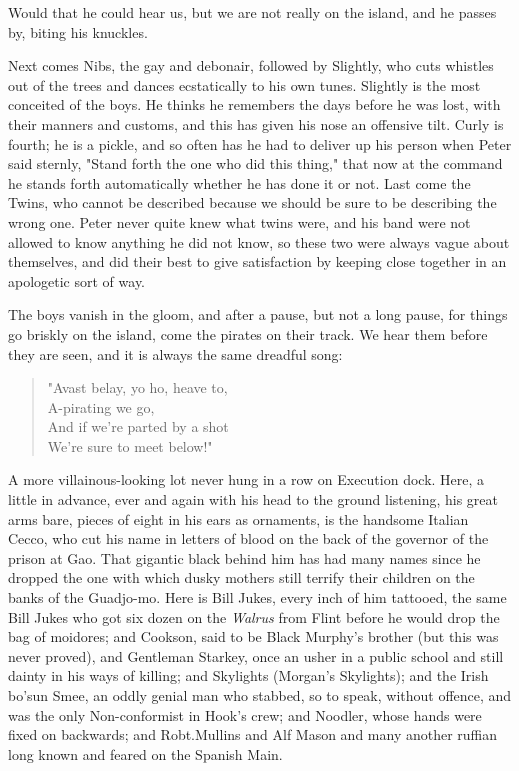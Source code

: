Would that he could hear us, but we are not really on the island, and he passes by, biting his knuckles.

Next comes Nibs, the gay and debonair, followed by Slightly, who cuts whistles out of the trees and dances ecstatically to his own tunes.
Slightly is the most conceited of the boys.
He thinks he remembers the days before he was lost, with their manners and customs, and this has given his nose an offensive tilt.
Curly is fourth;
he is a pickle, and so often has he had to deliver up his person when Peter said sternly, "Stand forth the one who did this thing," that now at the command he stands forth automatically whether he has done it or not.
Last come the Twins, who cannot be described because we should be sure to be describing the wrong one.
Peter never quite knew what twins were, and his band were not allowed to know anything he did not know, so these two were always vague about themselves, and did their best to give satisfaction by keeping close together in an apologetic sort of way.

The boys vanish in the gloom, and after a pause, but not a long pause, for things go briskly on the island, come the pirates on their track.
We hear them before they are seen, and it is always the same dreadful song:

\begin{verse}
	"Avast belay, yo ho, heave to,\\
	A-pirating we go,\\
	And if we're parted by a shot\\
	We're sure to meet below!"
\end{verse}

A more villainous-looking lot never hung in a row on Execution dock.
Here, a little in advance, ever and again with his head to the ground listening, his great arms bare, pieces of eight in his ears as ornaments, is the handsome Italian Cecco, who cut his name in letters of blood on the back of the governor of the prison at Gao.
That gigantic black behind him has had many names since he dropped the one with which dusky mothers still terrify their children on the banks of the Guadjo-mo.
Here is Bill Jukes, every inch of him tattooed, the same Bill Jukes who got six dozen on the \emph{Walrus} from Flint before he would drop the bag of moidores;
and Cookson, said to be Black Murphy's brother (but this was never proved), and Gentleman Starkey, once an usher in a public school and still dainty in his ways of killing;
and Skylights (Morgan's Skylights);
and the Irish bo'sun Smee, an oddly genial man who stabbed, so to speak, without offence, and was the only Non-conformist in Hook's crew;
and Noodler, whose hands were fixed on backwards;
and Robt.\@ Mullins and Alf Mason and many another ruffian long known and feared on the Spanish Main.

